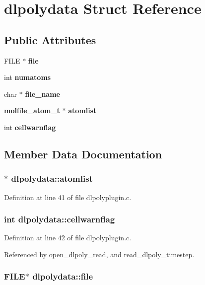 \section{dlpolydata  Struct Reference}
\label{structdlpolydata}
\subsection*{Public Attributes}
\begin{CompactItemize}
\item 
FILE $\ast$ {\bf file}
\item 
int {\bf numatoms}
\item 
char $\ast$ {\bf file\_\-name}
\item 
{\bf molfile\_\-atom\_\-t} $\ast$ {\bf atomlist}
\item 
int {\bf cellwarnflag}
\end{CompactItemize}


\subsection{Member Data Documentation}
\subsubsection{$\ast$ dlpolydata::atomlist}\label{structdlpolydata_m3}




Definition at line 41 of file dlpolyplugin.c.
\subsubsection{\setlength{\rightskip}{0pt plus 5cm}int dlpolydata::cellwarnflag}\label{structdlpolydata_m4}




Definition at line 42 of file dlpolyplugin.c.

Referenced by open\_\-dlpoly\_\-read, and read\_\-dlpoly\_\-timestep.
\subsubsection{\setlength{\rightskip}{0pt plus 5cm}FILE$\ast$ dlpolydata::file}\label{structdlpolydata_m0}




